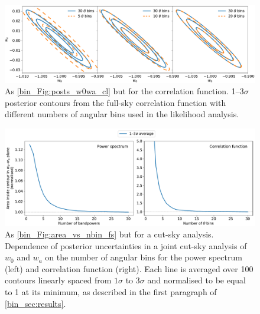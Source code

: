 \begin{figure}[t]
\includegraphics[width=\textwidth]{posts_w0wa_cf}
\caption{As \autoref{bin_Fig:posts_w0wa_cl} but for the correlation function. 1--3$\sigma$ posterior contours from the full-sky correlation function with different numbers of angular bins used in the likelihood analysis.}
\label{bin_Fig:posts_w0wa_cf}
\end{figure}

\begin{figure}[t]
\includegraphics[width=\textwidth]{area_vs_nbin_ma}
\caption{As \autoref{bin_Fig:area_vs_nbin_fs} but for a cut-sky analysis. Dependence of posterior uncertainties in a joint cut-sky analysis of $w_0$ and $w_a$ on the number of angular bins for the power spectrum (left) and correlation function (right). Each line is averaged over 100 contours linearly spaced from $1\sigma$ to $3\sigma$ and normalised to be equal to 1 at its minimum, as described in the first paragraph of \autoref{bin_sec:results}.}
\label{bin_Fig:area_vs_nbin_ma}
\end{figure}

